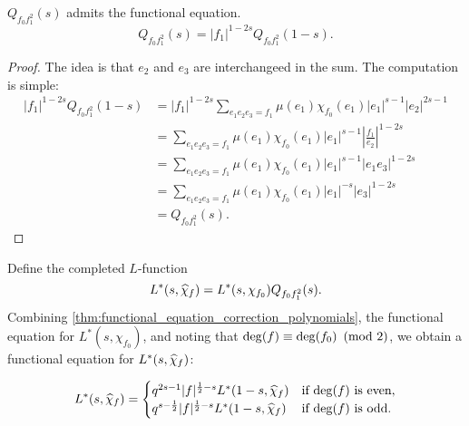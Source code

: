 \documentclass[12pt,reqno,oneside]{amsart}
\begin{document}
    \begin{theorem}\label{thm:functional_equation_correction_polynomials}
        $Q_{f_{0}f_{1}^{2}}(s)$ admits the functional equation.
        \[
            Q_{f_{0}f_{1}^{2}}(s) = |f_{1}|^{1-2s}Q_{f_{0}f_{1}^{2}}(1-s).
        \]
    \end{theorem}
    \begin{proof}
        The idea is that $e_{2}$ and $e_{3}$ are interchangeed in the sum. The computation is simple:
        \begin{align*}
            |f_{1}|^{1-2s}Q_{f_{0}f_{1}^{2}}(1-s) &= |f_{1}|^{1-2s}\sum_{e_{1}e_{2}e_{3} = f_{1}}\mu(e_{1})\chi_{f_{0}}(e_{1})|e_{1}|^{s-1}|e_{2}|^{2s-1} \\
            &= \sum_{e_{1}e_{2}e_{3} = f_{1}}\mu(e_{1})\chi_{f_{0}}(e_{1})|e_{1}|^{s-1}\left|\frac{f_{1}}{e_{2}}\right|^{1-2s} \\
            &= \sum_{e_{1}e_{2}e_{3} = f_{1}}\mu(e_{1})\chi_{f_{0}}(e_{1})|e_{1}|^{s-1}|e_{1}e_{3}|^{1-2s} \\
            &= \sum_{e_{1}e_{2}e_{3} = f_{1}}\mu(e_{1})\chi_{f_{0}}(e_{1})|e_{1}|^{-s}|e_{3}|^{1-2s} \\
            &= Q_{f_{0}f_{1}^{2}}(s).
        \end{align*}
    \end{proof}

    Define the completed $L$-function
    \[
        L^{\ast}(s,\widehat{\chi}_{f}) = L^{\ast}(s,\chi_{f_{0}})Q_{f_{0}f_{1}^{2}}(s).
    \]
    Combining \cref{thm:functional_equation_correction_polynomials}, the functional equation for $L^{\ast}(s,\chi_{f_{0}})$, and noting that $\deg(f) \equiv \deg(f_{0}) \ \left(\text{mod }2\right)$, we obtain a functional equation for $L^{\ast}(s,\widehat{\chi}_{f})$:

    \[
        L^{\ast}(s,\widehat{\chi}_{f}) = \begin{cases} q^{2s-1}|f|^{\frac{1}{2}-s}L^{\ast}(1-s,\widehat{\chi}_{f}) & \text{if $\deg(f)$ is even}, \\ q^{s-\frac{1}{2}}|f|^{\frac{1}{2}-s}L^{\ast}(1-s,\widehat{\chi}_{f}) & \text{if $\deg(f)$ is odd}. \end{cases}
    \]
\end{document}
